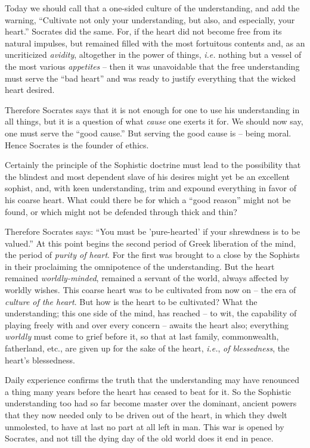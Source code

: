 Today we should call that a one-sided culture of the understanding, and add 
the warning, ``Cultivate not only your understanding, but also, and 
especially, your heart.'' Socrates did the same. For, if the heart did not 
become free from its natural impulses, but remained filled with the most 
fortuitous contents and, as an uncriticized \textit{avidity}, altogether in 
the power of things, \textit{i.e.} nothing but a vessel of the most various 
\textit{appetites} -- then it was unavoidable that the free understanding must 
serve the ``bad heart'' and was ready to justify everything that the wicked 
heart desired.

Therefore Socrates says that it is not enough for one to use his understanding 
in all things, but it is a question of what \textit{cause} one exerts it for. 
We should now say, one must serve the ``good cause.'' But serving the good 
cause is -- being moral. Hence Socrates is the founder of ethics.

Certainly the principle of the Sophistic doctrine must lead to the possibility 
that the blindest and most dependent slave of his desires might yet be an 
excellent sophist, and, with keen understanding, trim and expound everything 
in favor of his coarse heart. What could there be for which a ``good 
reason'' might not be found, or which might not be defended through thick and 
thin?

Therefore Socrates says: ``You must be 'pure-hearted' if your shrewdness is 
to be valued.'' At this point begins the second period of Greek liberation of 
the mind, the period of \textit{purity of heart}. For the first was brought to 
a close by the Sophists in their proclaiming the omnipotence of the 
understanding. But the heart remained \textit{worldly-minded}, remained a 
servant of the world, always affected by worldly wishes. This coarse heart was 
to be cultivated from now on -- the era of \textit{culture of the heart}. But 
how is the heart to be cultivated? What the understanding; this one side of 
the mind, has reached -- to wit, the capability of playing freely with and 
over every concern -- awaits the heart also; everything \textit{worldly} must 
come to grief before it, so that at last family, commonwealth, fatherland, 
etc., are given up for the sake of the heart, \textit{i.e.}, \textit{of 
blessedness}, the heart's blessedness.

Daily experience confirms the truth that the understanding may have renounced 
a thing many years before the heart has ceased to beat for it. So the 
Sophistic understanding too had so far become master over the dominant, 
ancient powers that they now needed only to be driven out of the heart, in 
which they dwelt unmolested, to have at last no part at all left in man. This 
war is opened by Socrates, and not till the dying day of the old world does it 
end in peace.

